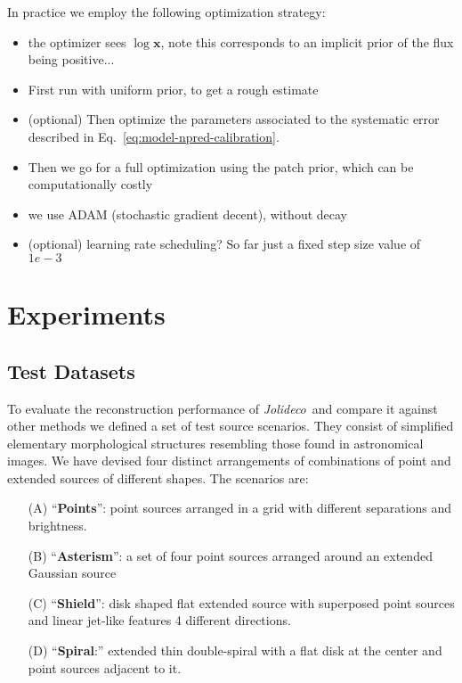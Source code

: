 \documentclass[twocolumn]{aastex631}
\newcommand{\jolideco}{\textit{Jolideco}~}
\begin{document}
    In practice we employ the following optimization strategy:
    \begin{itemize}
        \item the optimizer sees $\log{\mathbf{x}}$, note this corresponds to an implicit prior of the flux being positive...
        \item First run with uniform prior, to get a rough estimate
        \item (optional) Then optimize the parameters associated to the systematic error described in Eq.~\ref{eq:model-npred-calibration}.
        \item Then we go for a full optimization using the patch prior, which can be computationally costly
        \item we use ADAM (stochastic gradient decent), without decay
        \item  (optional) learning rate scheduling? So far just a fixed step size value of $1e-3$
    \end{itemize}
    
    
        
    \section{Experiments}
    \subsection{Test Datasets}
    \label{subsec:test-datasets}

    To evaluate the reconstruction performance of \jolideco and compare it against other methods we defined a set of test source scenarios. They consist of simplified elementary morphological structures resembling those found in astronomical images. We have devised four distinct arrangements of combinations of point and extended sources of different shapes. The scenarios are:
    
    \begin{itemize}
        \item[(A)] {\enquote{\bf Points}:} point sources arranged in a grid with different separations and brightness. 
        \item[(B)] {\enquote{\bf Asterism}:} a set of four point sources arranged around an extended Gaussian source
        \item[(C)] {\enquote{\bf Shield}:} disk shaped flat extended source with superposed point sources and linear jet-like features 4 different directions.
        \item[(D)] \enquote{{\bf Spiral}:} extended thin double-spiral with a flat disk at the center and point sources adjacent to it. 
    \end{itemize}
\end{document}
